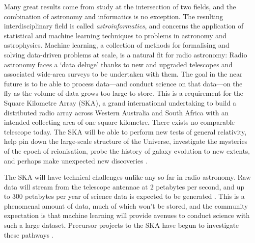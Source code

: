 \documentclass[11pt, a4paper]{book}
\newcommand{\defn}[1]{\emph{#1}}
\begin{document}
Many great results come from study at the intersection of two fields, and the combination of astronomy and informatics is no exception. The resulting interdisciplinary field is called \defn{astroinformatics}, and concerns the application of statistical and machine learning techniques to problems in astronomy and astrophysics.
Machine learning, a collection of methods for formalising and solving data-driven problems at scale, is a natural fit for radio astronomy: Radio astronomy faces a `data deluge' thanks to new and upgraded telescopes and associated wide-area surveys to be undertaken with them. The goal in the near future is to be able to process data---and conduct science on that data---on the fly as the volume of data grows too large to store. This is a requirement for the Square Kilometre Array (SKA), a grand international undertaking to build a distributed radio array across Western Australia and South Africa with an intended collecting area of one square kilometre. There exists no comparable telescope today. The SKA will be able to perform new tests of general relativity, help pin down the large-scale structure of the Universe, investigate the mysteries of the epoch of reionisation, probe the history of galaxy evolution to new extents, and perhaps make unexpected new discoveries \citep{diamond_ska_2017}.

The SKA will have technical challenges unlike any so far in radio astronomy. Raw data will stream from the telescope antennae at 2 petabytes per second, and up to 300 petabytes per year of science data is expected to be generated \citep{diamond_ska_2017}. This is a phenomenal amount of data, much of which won't be stored, and the community expectation is that machine learning will provide avenues to conduct science with such a large dataset. Precursor projects to the SKA have begun to investigate these pathways \citep[e.g.][]{bonaldi_square_2020,kapinska_emu_2020,mostert_unveiling_2020}.
\end{document}
